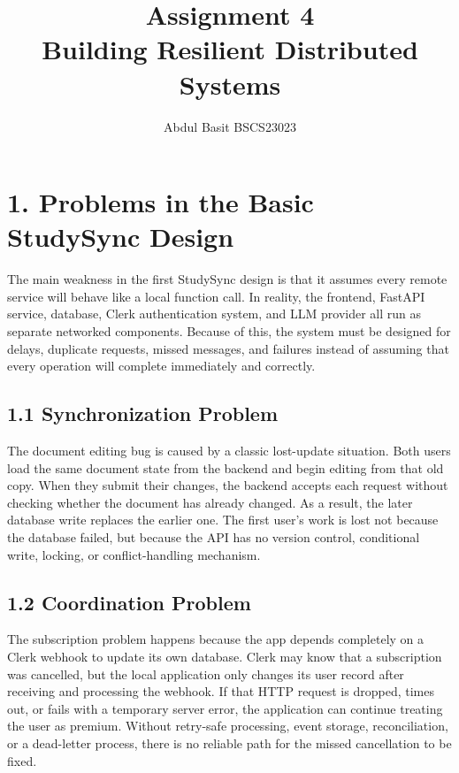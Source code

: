 \documentclass[10pt]{article}
\title{\vspace{-2em}\textbf{Assignment 4}\\Building Resilient Distributed Systems}
\author{Abdul Basit \quad BSCS23023}
\date{}
\begin{document}
\maketitle
\vspace{-1.6em}

\section*{1. Problems in the Basic StudySync Design}

The main weakness in the first StudySync design is that it assumes every remote
service will behave like a local function call. In reality, the frontend,
FastAPI service, database, Clerk authentication system, and LLM provider all run
as separate networked components. Because of this, the system must be designed
for delays, duplicate requests, missed messages, and failures instead of assuming
that every operation will complete immediately and correctly.

\subsection*{1.1 Synchronization Problem}

The document editing bug is caused by a classic lost-update situation. Both users
load the same document state from the backend and begin editing from that old
copy. When they submit their changes, the backend accepts each request without
checking whether the document has already changed. As a result, the later
database write replaces the earlier one. The first user's work is lost not
because the database failed, but because the API has no version control,
conditional write, locking, or conflict-handling mechanism.

\subsection*{1.2 Coordination Problem}

The subscription problem happens because the app depends completely on a Clerk
webhook to update its own database. Clerk may know that a subscription was
cancelled, but the local application only changes its user record after receiving
and processing the webhook. If that HTTP request is dropped, times out, or fails
with a temporary server error, the application can continue treating the user as
premium. Without retry-safe processing, event storage, reconciliation, or a
dead-letter process, there is no reliable path for the missed cancellation to be
fixed.
\end{document}
